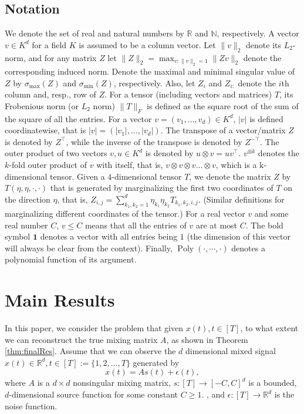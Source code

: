 \documentclass{article} %
\newcommand{\real}{\mathbb{R}}
\renewcommand{\natural}{\mathbb{N}}
\DeclareMathOperator{\pol}{Poly}
\newcommand{\poly}[1]{\pol\left(#1\right)}
\theoremstyle{definition}
\begin{document}
\subsection{Notation}
We denote the set of real and natural numbers by $\real$ and $\natural$, respectively.
A vector $v \in K^d$ for a field $K$ is assumed to be a column vector.
Let $\|v\|_2$ denote its $L_2$-norm, and for any matrix $Z$ let $\|Z\|_2=\max_{v:\|v\|_2=1}{\|Z v\|_2}$ denote the corresponding induced norm. Denote the maximal and minimal singular value of $Z$ by $\sigma_{\max}(Z)$ and  $\sigma_{\min}(Z)$, respectively. Also, let $Z_i$ and $Z_{i:}$ denote the $i$th column and, resp., row of $Z$.
For a tensor (including vectors and matrices) $T$, its Frobenious norm (or $L_2$ norm) $\|T\|_F$  is defined as the square root of the sum of the square of all the entries.  
For a vector $v=(v_1,\ldots,v_d) \in K^d$, $\vert v \vert$ is defined coordinatewise, that is $\vert v \vert=(\vert v_1 \vert,\ldots,\vert v_d\vert)$. 
The transpose of a vector/matrix $Z$ is denoted by $Z^\top$, while the inverse of the transpose is denoted by $Z^{-\top}$.  
The outer product of two vectors $v, u \in K^d$ is denoted by $u\otimes v=u v^\top$. 
$v^{\otimes k}$ denotes the $k$-fold outer product of $v$ with itself, that is, $v\otimes v\otimes v \ldots \otimes v$, which is a k-dimensional tensor.
Given a $4$-dimensional tensor $T$, we denote the matrix $Z$ by $T(\eta,\eta,\cdot , \cdot)$ that is generated by marginalizing the first two coordinates of $T$ on the direction $\eta$, that is,
$Z_{i,j} = \sum_{k_1,k_2 = 1}^{d} \eta_{k_1} \eta_{k_2} T_{k_1,k_2,i,j}$. (Similar definitions for marginalizing different coordinates of the tensor.)
For a real vector $v$ and some real number $C$, $v \le C$ means that all the entries of $v$ are at most $C$. 
The bold symbol $\boldsymbol{1}$ denotes a vector with all entries being $1$ (the dimension of this vector will always be clear from the context).
Finally, $\poly{\cdot,\cdots,\cdot}$ denotes a polynomial function of its argument.

\section{Main Results}
\label{sec:main}
In this paper, we consider the problem that given $x(t), t\in [T]$, to what extent we can reconstruct the true mixing matrix $A$, as shown in Theorem \ref{thm:finalRes}.
Assume that we can observe the $d$ dimensional mixed signal $x(t) \in \real^d, t \in [T]:=\{1,2,\ldots,T\}$ generated by  
\vspace{-2mm}
\begin{equation}
\label{eq:ICA}
x(t) = As(t)+\epsilon(t),
\end{equation}
where $A$ is a $d\times d$ nonsingular mixing matrix,  $s:[T] \to [-C,C]^d$ is a bounded, $d$-dimensional source function for some constant $C \ge 1$. , and $\epsilon:[T] \to \real^d$ is the noise function. 
\end{document}
